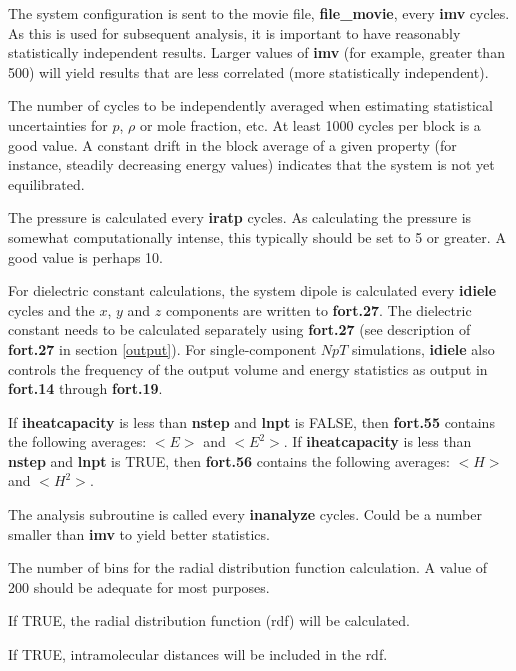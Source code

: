 \documentclass[12pt,letterpaper]{article}
\begin{document}
 The system configuration is sent to the
movie file, {\bf file\_movie}, every {\bf imv} cycles. As
this is used for subsequent analysis, it is important to
have reasonably statistically independent results. Larger
values of {\bf imv} (for example, greater than 500) will
yield results that are less correlated (more statistically
independent).

 The number of cycles to be
independently averaged when estimating statistical
uncertainties for $p$, $\rho$ or mole fraction, etc. At
least 1000 cycles per block is a good value. A constant
drift in the block average of a given property (for
instance, steadily decreasing energy values) indicates that
the system is not yet equilibrated.

 The pressure is calculated every {\bf
  iratp} cycles. As calculating the pressure is somewhat
computationally intense, this typically should be set to 5
or greater. A good value is perhaps 10.

 For dielectric constant calculations,
the system dipole is calculated every {\bf idiele} cycles
and the $x$, $y$ and $z$ components are written to {\bf
  fort.27}. The dielectric constant needs to be calculated
separately using {\bf fort.27} (see description of {\bf
  fort.27} in section \ref{output}). For single-component
$NpT$ simulations, {\bf idiele} also controls the frequency
of the output volume and energy statistics as output in {\bf
  fort.14} through {\bf fort.19}.

 If {\bf iheatcapacity} is less
than {\bf nstep} and {\bf lnpt} is FALSE, then {\bf fort.55}
contains the following averages: $<E>$ and $<E^2>$. If {\bf
  iheatcapacity} is less than {\bf nstep} and {\bf lnpt} is
TRUE, then {\bf fort.56} contains the following averages:
$<H>$ and $<H^2>$.

 The analysis subroutine is called
every {\bf inanalyze} cycles. Could be a number smaller than
{\bf imv} to yield better statistics.

 The number of bins for the radial
distribution function calculation. A value of 200 should be
adequate for most purposes.

 If TRUE, the radial distribution function (rdf) will be calculated.

 If TRUE, intramolecular distances will be included in the rdf.
\end{document}
